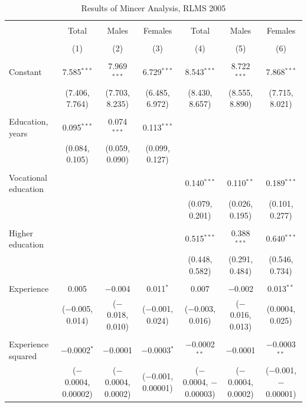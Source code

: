 \documentclass[12pt,a4paper]{article}
\numberwithin{equation}{section}
\begin{document}
\begin{landscape}
	
	\fontsize{9}{11}
	\selectfont
	
	\begin{table}[!htbp] \centering 
		\caption{Results of Mincer Analysis, RLMS 2005} 
		\label{} 
		\begin{tabular}{@{\extracolsep{5pt}}lcccccc} 
			\\[-1.8ex]\hline 
			\hline \\[-1.8ex] 
			& Total & Males & Females & Total & Males & Females \\ 
			\\[-1.8ex] & (1) & (2) & (3) & (4) & (5) & (6)\\ 
			\hline \\[-1.8ex] 
			Constant & 7.585$^{***}$ & 7.969$^{***}$ & 6.729$^{***}$ & 8.543$^{***}$ & 8.722$^{***}$ & 7.868$^{***}$ \\ 
			& (7.406, 7.764) & (7.703, 8.235) & (6.485, 6.972) & (8.430, 8.657) & (8.555, 8.890) & (7.715, 8.021) \\ 
			& & & & & & \\ 
			Education, years & 0.095$^{***}$ & 0.074$^{***}$ & 0.113$^{***}$ &  &  &  \\ 
			& (0.084, 0.105) & (0.059, 0.090) & (0.099, 0.127) &  &  &  \\ 
			& & & & & & \\ 
			Vocational education &  &  &  & 0.140$^{***}$ & 0.110$^{**}$ & 0.189$^{***}$ \\ 
			&  &  &  & (0.079, 0.201) & (0.026, 0.195) & (0.101, 0.277) \\ 
			& & & & & & \\ 
			Higher education &  &  &  & 0.515$^{***}$ & 0.388$^{***}$ & 0.640$^{***}$ \\ 
			&  &  &  & (0.448, 0.582) & (0.291, 0.484) & (0.546, 0.734) \\ 
			& & & & & & \\ 
			Experience & 0.005 & $-$0.004 & 0.011$^{*}$ & 0.007 & $-$0.002 & 0.013$^{**}$ \\ 
			& ($-$0.005, 0.014) & ($-$0.018, 0.010) & ($-$0.001, 0.024) & ($-$0.003, 0.016) & ($-$0.016, 0.013) & (0.0004, 0.025) \\ 
			& & & & & & \\ 
			Experience squared & $-$0.0002$^{*}$ & $-$0.0001 & $-$0.0003$^{*}$ & $-$0.0002$^{**}$ & $-$0.0001 & $-$0.0003$^{**}$ \\ 
			& ($-$0.0004, 0.00002) & ($-$0.0004, 0.0002) & ($-$0.001, 0.00001) & ($-$0.0004, $-$0.00003) & ($-$0.0004, 0.0002) & ($-$0.001, $-$0.00001) \\ 

\end{tabular}
\end{table}
\end{landscape}
\end{document}

